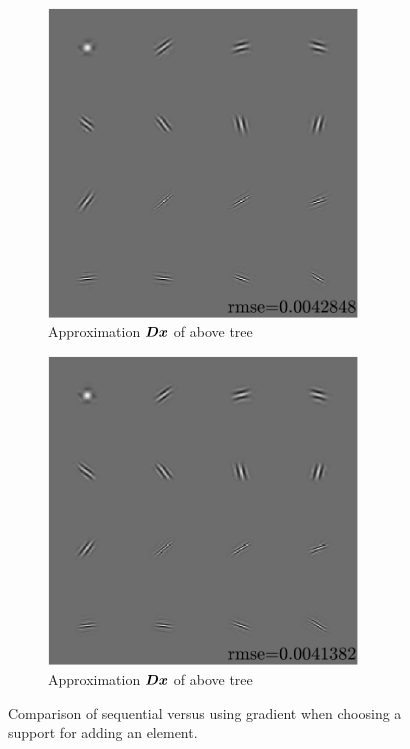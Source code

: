 \begin{figure}[!h] \ContinuedFloat
\begin{subfigure}[b]{0.49\textwidth}\centering
\includegraphics[width=0.9\textwidth]{figures/tree-learn/gradient-vs-sequential/xp_learnsupp256_curvelet_decomp3_tree-binary_dpth4_supp-diracs_usegrad1_every5_add5_totinit0_totadd279_alpha30_approx.pdf}
	\caption{Approximation $\bm{D}\bm{x}$ of above tree}\label{fig_cmp_grad_approx}
\end{subfigure}
\begin{subfigure}[b]{0.49\textwidth}\centering
\includegraphics[width=0.9\textwidth]{figures/tree-learn/gradient-vs-sequential/xp_learnsupp256_curvelet_decomp3_tree-binary_dpth4_supp-diracs_usegrad0_every5_add5_totinit0_totadd279_alpha30_approx.pdf} 
	\caption{Approximation $\bm{D}\bm{x}$ of above tree}\label{fig_cmp_seq_approx}
\end{subfigure}
\caption{Comparison of sequential versus using gradient when choosing a support for adding an element.}\label{fig_cmp_seq_vs_grad}
\end{figure}


